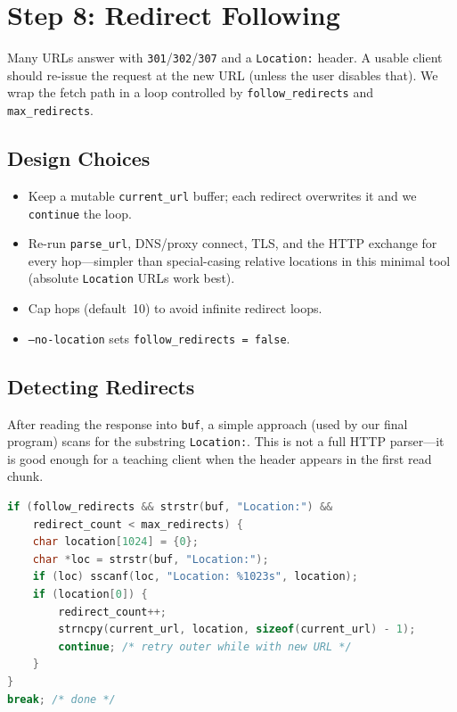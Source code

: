 \section{Step 8: Redirect Following}

Many URLs answer with \texttt{301}/\texttt{302}/\texttt{307} and a
\texttt{Location:} header. A usable client should re-issue the request at the
new URL (unless the user disables that). We wrap the fetch path in a loop
controlled by \texttt{follow\_redirects} and \texttt{max\_redirects}.

\subsection{Design Choices}

\begin{itemize}[leftmargin=1.4em]
    \item Keep a mutable \texttt{current\_url} buffer; each redirect overwrites
          it and we \texttt{continue} the loop.
    \item Re-run \texttt{parse\_url}, DNS/proxy connect, TLS, and the HTTP
          exchange for every hop---simpler than special-casing relative
          locations in this minimal tool (absolute \texttt{Location} URLs work
          best).
    \item Cap hops (default~10) to avoid infinite redirect loops.
    \item \texttt{--no-location} sets \texttt{follow\_redirects = false}.
\end{itemize}

\subsection{Detecting Redirects}

After reading the response into \texttt{buf}, a simple approach (used by our
final program) scans for the substring \texttt{Location:}. This is not a full
HTTP parser---it is good enough for a teaching client when the header appears
in the first read chunk.

\begin{lstlisting}[style=snippet,language=C]
if (follow_redirects && strstr(buf, "Location:") &&
    redirect_count < max_redirects) {
    char location[1024] = {0};
    char *loc = strstr(buf, "Location:");
    if (loc) sscanf(loc, "Location: %1023s", location);
    if (location[0]) {
        redirect_count++;
        strncpy(current_url, location, sizeof(current_url) - 1);
        continue; /* retry outer while with new URL */
    }
}
break; /* done */
\end{lstlisting}

